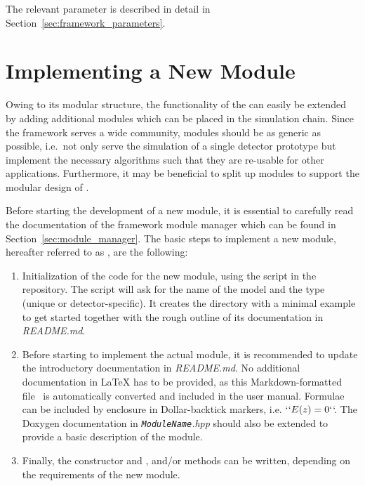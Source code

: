 The relevant parameter is described in detail in Section~\ref{sec:framework_parameters}.

\section{Implementing a New Module}
\label{sec:building_new_module}

Owing to its modular structure, the functionality of the \apsq can easily be extended by adding additional modules which can be placed in the simulation chain.
Since the framework serves a wide community, modules should be as generic as possible, i.e.\ not only serve the simulation of a single detector prototype but implement the necessary algorithms such that they are re-usable for other applications.
Furthermore, it may be beneficial to split up modules to support the modular design of \apsq.

Before starting the development of a new module, it is essential to carefully read the documentation of the framework module manager which can be found in Section~\ref{sec:module_manager}.
The basic steps to implement a new module, hereafter referred to as , are the following:
\begin{enumerate}
    \item Initialization of the code for the new module, using the script  in the repository.
    The script will ask for the name of the model and the type (unique or detector-specific).
    It creates the directory with a minimal example to get started together with the rough outline of its documentation in \textit{README.md}.
    \item Before starting to implement the actual module, it is recommended to update the introductory documentation in \textit{README.md}.
    No additional documentation in LaTeX has to be provided, as this Markdown-formatted file~\cite{markdown} is automatically converted and included in the user manual.
    Formulae can be included by enclosure in Dollar-backtick markers, i.e. `$` E(z) = 0`$`.
    The Doxygen documentation in \textit{\texttt{ModuleName}.hpp} should also be extended to provide a basic description of the module.
    \item Finally, the constructor and ,  and/or  methods can be written, depending on the requirements of the new module.
\end{enumerate}

